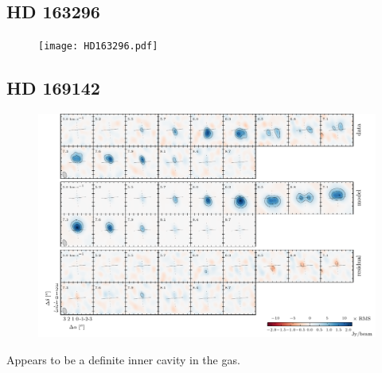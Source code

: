 \documentclass[twocolumn]{aastex6}
\begin{document}
\subsection{HD 163296}

\begin{figure}[htb]
\begin{center}
  \texttt{[image: HD163296.pdf]}
  \end{center}
\end{figure}

\subsection{HD 169142}

\begin{figure}[htb]
\begin{center}
  \includegraphics[draft]{HD169142.pdf}
  \end{center}
\end{figure}

Appears to be a definite inner cavity in the gas.
\end{document}
